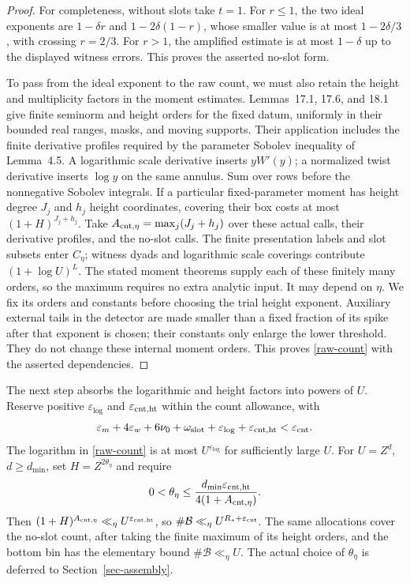 \documentclass[10pt,reqno,a4paper]{amsart}
\theoremstyle{remark}
\newcommand{\eps}{\varepsilon}
\begin{document}
\begin{proof}
For completeness, without slots take $t=1$. For $r\le1$, the two
ideal exponents are $1-\delta r$ and $1-2\delta(1-r)$, whose
smaller value is at most $1-2\delta/3$, with crossing $r=2/3$.
For $r>1$, the amplified estimate is at most $1-\delta$ up to
the displayed witness errors. This proves the asserted no-slot form.

To pass from the ideal exponent to the raw count, we must also retain
the height and multiplicity factors in the moment estimates. Lemmas~17.1, 17.6, and 18.1 give finite seminorm and
height orders for the fixed datum, uniformly in their bounded real
ranges, masks, and moving supports. Their application includes the
finite derivative profiles required by the parameter Sobolev inequality
of Lemma~4.5. A logarithmic scale derivative inserts $yW'(y)$;
a normalized twist derivative inserts $\log y$ on the same annulus.
Sum over rows before the nonnegative Sobolev integrals. If a particular
fixed-parameter moment has height degree $J_j$ and $h_j$ height
coordinates, covering their box costs at most $(1+H)^{J_j+h_j}$.
Take $A_{{\rm cnt},\eta}=\max_j(J_j+h_j)$ over these actual calls,
their derivative profiles, and the no-slot calls. The finite presentation
labels and slot subsets enter $C_\eta$; witness dyads and logarithmic
scale coverings contribute $(1+\log U)^L$.
The stated moment theorems supply each of these finitely many orders,
so the maximum requires no extra analytic input. It may depend on $\eta$.
We fix its orders and constants before choosing the trial height exponent.
Auxiliary external tails in the detector are made smaller than a fixed
fraction of its spike after that exponent is chosen; their constants
only enlarge the lower threshold. They do not change these internal
moment orders. This proves \eqref{raw-count} with the asserted dependencies.
\end{proof}

The next step absorbs the logarithmic and height factors into powers
of $U$. Reserve positive $\eps_{\log}$ and
$\eps_{{\rm cnt},{\rm ht}}$ within the count allowance, with
\begin{equation}\label{count-loss-budget}
 \eps_m+4\eps_w+6\nu_0+\omega_{\rm slot}
       +\eps_{\log}+\eps_{{\rm cnt},{\rm ht}}<\eps_{\rm cnt}.
\end{equation}
The logarithm in \eqref{raw-count} is at most $U^{\eps_{\log}}$
for sufficiently large $U$. For $U=Z^d$, $d\ge d_{\min}$, set
$H=Z^{2\theta_\eta}$ and require
\begin{equation}\label{count-height-ceiling}
 0<\theta_\eta\le
 \frac{d_{\min}\eps_{{\rm cnt},{\rm ht}}}
      {4(1+A_{{\rm cnt},\eta})}.
\end{equation}
Then $(1+H)^{A_{{\rm cnt},\eta}}\ll_\eta
U^{\eps_{{\rm cnt},{\rm ht}}}$, so
$\#\mathcal B\ll_\eta U^{R_*+\eps_{\rm cnt}}$.
The same allocations cover the no-slot count, after taking the finite
maximum of its height orders, and the bottom bin has the elementary
bound $\#\mathcal B\ll_\eta U$. The actual choice of
$\theta_\eta$ is deferred to Section~\ref{sec-assembly}.
\end{document}
